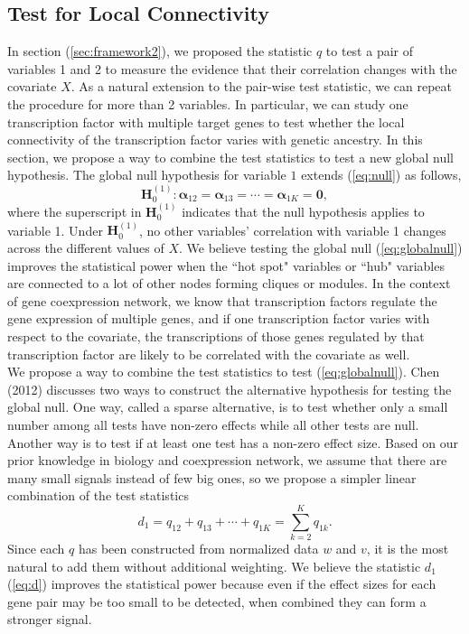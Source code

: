\documentclass[aap, preprint]{imsart}
\numberwithin{equation}{section}
\theoremstyle{plain}
\begin{document}
\subsection{Test for Local Connectivity \label{sec:frameworkK}} 
In section (\ref{sec:framework2}), we proposed the statistic $q$ to test a pair of variables 1 and 2 to measure the evidence that their correlation changes with the covariate $X$. As a natural extension to the pair-wise test statistic, we can repeat the procedure for more than 2 variables. In particular, we can study one transcription factor with  multiple target genes to test whether the local connectivity of the transcription factor varies with genetic ancestry. In this section, we propose a way to combine the test statistics to test a new global null hypothesis. The global null hypothesis for variable $1$ extends (\ref{eq:null}) as follows,
\begin{equation}
    \bm{H}_0^{(1)}: \bm{\alpha}_{12} = \bm{\alpha}_{13} = \cdots = \bm{\alpha}_{1K} = \bm{0},
\label{eq:globalnull}
\end{equation}
where the superscript in $\bm{H}_0^{(1)}$ indicates that the null hypothesis applies to variable 1. Under $\bm{H}_0^{(1)}$, no other variables' correlation with variable 1 changes across the different values of  $X$. We believe testing the global null (\ref{eq:globalnull}) improves the statistical power when the ``hot spot" variables or ``hub" variables are connected to a lot of other nodes forming cliques or modules. In the context of gene coexpression network, we know that transcription factors regulate the gene expression of multiple genes, and if one transcription factor varies with respect to the covariate, the transcriptions of those genes regulated by that transcription factor are likely to be correlated with the covariate as well. \\

We propose a way to combine the test statistics to test (\ref{eq:globalnull}). Chen (2012) discusses two ways to construct the alternative hypothesis \cite{chen2012exponential} for testing the global null. One way, called a sparse alternative, is to test whether only a small number among all tests have non-zero effects while all other tests are null. Another way is to test if at least one test has a non-zero effect size. Based on our prior knowledge in biology and coexpression network, we assume that there are many small signals instead of few big ones, so we propose a simpler linear combination of the test statistics
\begin{equation}
d_1 = {q}_{12} + {q}_{13} + \cdots + {q}_{1K} = \sum_{k=2}^{K} {q}_{1k}.
\label{eq:d}
\end{equation}
Since each $q$ has been constructed from normalized data $w$ and $v$, it is the most natural to add them without additional weighting. We believe the statistic $d_1$ (\ref{eq:d}) improves the statistical power because even if the effect sizes for each gene pair may be too small to be detected, when combined they can form a stronger signal. \\
\end{document}
